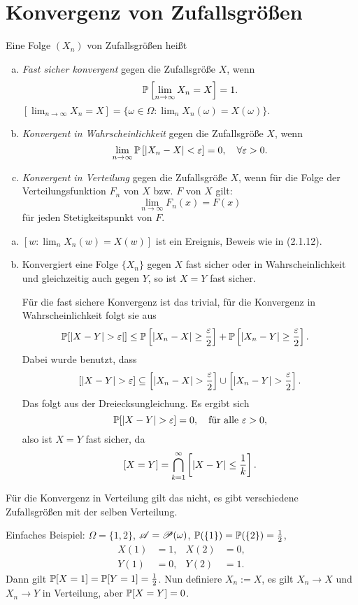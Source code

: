 \section{Konvergenz von Zufallsgrößen}
\begin{defn}
  Eine Folge $(X_n)$ von Zufallsgrößen heißt
  \begin{enumerate}[a)]
  \item \emph{Fast sicher konvergent} gegen die Zufallsgröße $X$, wenn
    \[ \mathbb{P} \left[ \lim_{n \to \infty} X_n = X \right] = 1. \]
    $\left[ \lim_{n \to \infty} X_n = X \right] = \{ \omega \in \Omega : \lim_n
    X_n(\omega) = X(\omega) \}.$
  \item \emph{Konvergent in Wahrscheinlichkeit} gegen die Zufallsgröße $X$, wenn
    \[ \lim_{n \to \infty} \mathbb{P} \left[ |X_n-X| < \varepsilon \right] = 0 , \quad \forall
      \varepsilon > 0. \]
  \item \emph{Konvergent in Verteilung} gegen die Zufallsgröße $X$, wenn für die
    Folge der Verteilungsfunktion $F_n$ von $X$ bzw. $F$ von $X$ gilt:
    \[ \lim_{n \to \infty} F_n(x) = F(x) \]
    für jeden Stetigkeitspunkt von $F$.
  \end{enumerate}
\end{defn}

\begin{rmrk}
  \begin{enumerate}[(a)]
  \item $[w : \lim_n X_n(w) = X(w)]$ ist ein Ereignis, Beweis wie in (2.1.12).
  \item Konvergiert eine Folge $\{X_n\}$ gegen $X$ fast sicher oder in
    Wahrscheinlichkeit und gleichzeitig auch gegen $Y$, so ist $X=Y$ fast
    sicher.

    Für die fast sichere Konvergenz ist das trivial, für die Konvergenz in
    Wahrscheinlichkeit folgt sie aus
    \begin{align*}
      \mathbb{P} [ |X-Y| > \varepsilon | ]
      &\le \mathbb{P} \left[ |X_n - X| \ge \frac{\varepsilon}{2} \right]
        + \mathbb{P} \left[ |X_n - Y| \ge \frac{\varepsilon}{2} \right].
    \end{align*}
    Dabei wurde benutzt, dass
    \[ [|X-Y| > \varepsilon ] \subseteq
      \left[ |X_n-X| > \frac{\varepsilon}{2} \right] \cup
      \left[ |X_n-Y| > \frac{\varepsilon}{2} \right].
    \]
    Das folgt aus der Dreiecksungleichung. Es ergibt sich
    \[ \mathbb{P} [ |X-Y| > \varepsilon ] = 0, \quad \text{für alle } \varepsilon > 0,  \]
    also ist $X=Y$ fast sicher, da
    \[ [X=Y] = \bigcap_{k=1}^\infty \left[ |X-Y| \le \frac{1}{k} \right]. \]
  \end{enumerate}
  Für die Konvergenz  in Verteilung gilt das nicht, es gibt verschiedene
  Zufallsgrößen mit der selben Verteilung.

  Einfaches Beispiel: $\Omega = \{1,2\}$, $\mathscr{A} = \mathscr{P}(\omega)$, $\mathbb{P}(\{1\}) =
  \mathbb{P}(\{2\})= \frac{1}{2}$,
  \begin{align*}
    X(1) &= 1, & X(2) &= 0, \\
    Y(1) &= 0, & Y(2) &= 1.
  \end{align*}
  Dann gilt $\mathbb{P}[X=1] = \mathbb{P}[Y=1] = \frac{1}{2}$. Nun definiere $X_n := X$, es gilt
  $X_n \to X$ und $X_n \to Y$ in Verteilung, aber $\mathbb{P}[X=Y]=0$.
\end{rmrk}

